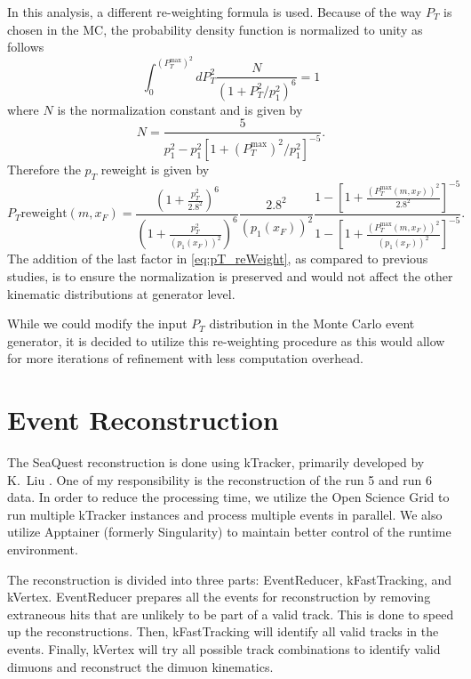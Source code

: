 \documentclass[../main.tex]{subfiles}
\begin{document}
In this analysis, a different re-weighting formula is used. Because of the way $P_T$ is chosen
in the MC, the probability density function is normalized to unity as follows
\begin{equation}
	\int^{\left(P_T^{\mathrm{max}}\right)^2}_0 dP_T^2 \frac{N}{\left(1+ P_T^2/p_1^2\right)^6}=1
\end{equation}
where $N$ is the normalization constant and is given by
\begin{equation}
	N=\frac{5}{p_1^2-p_1^2\left[ 1+ \left(P_T^{\mathrm{max}}\right)^2/p_1^2\right]^{-5}}.
\end{equation}
Therefore the $p_T$ reweight is given by
\begin{equation}
	P_T \mathrm{ reweight}\left(m,x_F\right)=
	\frac{\left(1 + \frac{p_T^2}{2.8^2} \right)^6}{\left(1 + \frac{p_T^2}{\left(p_1\left(x_F\right)\right)^2} \right)^6} \frac{2.8^2}{\left(p_1\left(x_F\right)\right)^2}\frac{1-\left[ 1+ \frac{\left(P_T^{\mathrm{max}}\left(m,x_F\right)\right)^2}{2.8^2}\right]^{-5}}{1-\left[ 1+ \frac{\left(P_T^{\mathrm{max}}\left(m,x_F\right)\right)^2}{\left(p_1\left(x_F\right)\right)^2}\right]^{-5}}.
	\label{eq:pT_reWeight}
\end{equation}
The addition of the last factor in \cref{eq:pT_reWeight}, as compared to previous studies,
is to ensure the normalization is preserved and would not affect the other kinematic
distributions at generator level.

While we could modify the input $P_T$ distribution in the Monte Carlo event generator,
it is decided to utilize this re-weighting procedure as this would allow for
more iterations of refinement with less computation overhead.

\section{Event Reconstruction}
The SeaQuest reconstruction is done using kTracker, primarily developed by K.~Liu \cite{kTracker}.
One of my responsibility is the reconstruction of the run 5 and run 6 data. In order to reduce the processing
time, we utilize the Open Science Grid \cite{ruthpordes2007,sfiligoi2009,osg2006} to run multiple kTracker
instances and process multiple events in parallel.
We also utilize Apptainer (formerly Singularity)\cite{kurtzer2021} to maintain better control of the
runtime environment.

The reconstruction is divided into three parts: EventReducer, kFastTracking, and kVertex.
EventReducer prepares all the events for reconstruction by removing extraneous hits that are
unlikely to be part of a valid track. This is done to speed up the reconstructions. Then, kFastTracking
will identify all valid tracks in the events. Finally, kVertex will try all possible track combinations
to identify valid dimuons and reconstruct the dimuon kinematics.
\end{document}
